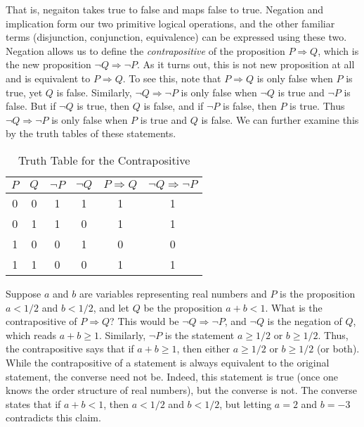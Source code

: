         That is, negaiton takes true to false and maps false to true. Negation
        and implication form our two primitive logical operations, and the other
        familiar terms (disjunction, conjunction, equivalence) can be expressed
        using these two. Negation allows us to define the
        \textit{contrapositive} of the proposition
        $P\Rightarrow{Q}$, which is the new proposition
        $\neg{Q}\Rightarrow\neg{P}$. As it turns out, this is not new
        proposition at all and is equivalent to $P\Rightarrow{Q}$. To see this,
        note that $P\Rightarrow{Q}$ is only false when $P$ is true, yet $Q$ is
        false. Similarly, $\neg{Q}\Rightarrow\neg{P}$ is only false when
        $\neg{Q}$ is true and $\neg{P}$ is false. But if $\neg{Q}$ is true, then
        $Q$ is false, and if $\neg{P}$ is false, then $P$ is true. Thus
        $\neg{Q}\Rightarrow\neg{P}$ is only false when $P$ is true and $Q$ is
        false. We can further examine this by the truth tables of these
        statements.
        \begin{table}[H]
            \centering
            \captionsetup{type=table}
            \begin{tabular}{cccccc}
                $P$&$Q$&$\neg{P}$&$\neg{Q}$&$P\Rightarrow{Q}$
                    &$\neg{Q}\Rightarrow\neg{P}$\\
                \hline
                0&0&1&1&1&1\\
                0&1&1&0&1&1\\
                1&0&0&1&0&0\\
                1&1&0&0&1&1
            \end{tabular}
            \caption{Truth Table for the Contrapositive}
            \label{tab:Truth_Table_for_Contrapositive}
        \end{table}
        \begin{example}
            Suppose $a$ and $b$ are variables representing real numbers and $P$
            is the proposition $a<1/2$ and $b<1/2$, and let $Q$ be the
            proposition $a+b<1$. What is the contrapositive of
            $P\Rightarrow{Q}$? This would be $\neg{Q}\Rightarrow\neg{P}$, and
            $\neg{Q}$ is the negation of $Q$, which reads $a+b\geq{1}$.
            Similarly, $\neg{P}$ is the statement $a\geq{1}/2$ or $b\geq{1}/2$.
            Thus, the contrapositive says that if $a+b\geq{1}$, then either
            $a\geq{1}/2$ or $b\geq{1}/2$ (or both). While the contrapositive of
            a statement is always equivalent to the original statement, the
            converse need not be. Indeed, this statement is true (once one knows
            the order structure of real numbers), but the converse is not. The
            converse states that if $a+b<1$, then $a<1/2$ and $b<1/2$, but
            letting $a=2$ and $b=\minus{3}$ contradicts this claim.
        \end{example}

